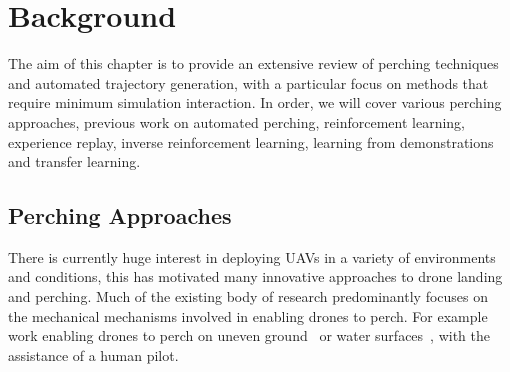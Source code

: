 \chapter{Background}


The aim of this chapter is to provide an extensive review of perching techniques and automated trajectory generation, with a particular focus on methods that require minimum simulation interaction.
In order, we will cover various perching approaches, previous work on automated perching, reinforcement learning, experience replay, inverse reinforcement learning, learning from demonstrations and transfer learning.
\section{Perching Approaches}


There is currently huge interest in deploying UAVs in a variety of environments and conditions, this has motivated many innovative approaches to drone landing and perching.
Much of the existing body of research predominantly focuses on the mechanical mechanisms involved in enabling drones to perch.
For example work enabling drones to perch on uneven ground~\cite{perching-uneven-ground} or water surfaces~\cite{perching-water1,perching-water2}, with the assistance of a human pilot.

